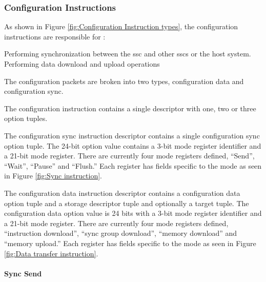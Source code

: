\subsubsection{Configuration Instructions}
\label{sec:Decoding Configuration Instructions}

As shown in Figure \ref{fig:Configuration Instruction types}, the configuration instructions are responsible for :
\begin{outline}
 \1 Performing synchronization between the \ac{ssc} and other \acp{ssc} or the host system.
 \1 Performing data download and upload operations
\end{outline}

The configuration packets are broken into two types, configuration data and configuration sync.
\iffalse
Currently the sync instruction has been implemented.
It is assumed at this point that adequate infrastructure and extensibility has been built into the system to allow implementation without adding significant amounts of logic.
\fi

The configuration instruction contains a single descriptor with one, two or three option tuples.

The configuration sync instruction descriptor contains a single configuration sync option tuple. The 24-bit option value contains a 3-bit mode register identifier and a 21-bit mode register.
There are currently four mode registers defined, ``Send'', ``Wait'', ``Pause'' and ``Flush.'' Each register has fields specific to the mode as seen in Figure \ref{fig:Sync instruction}.

The configuration data instruction descriptor contains a configuration data option tuple and a storage descriptor tuple and optionally a target tuple. 
The configuration data option value is 24 bits with a 3-bit mode register identifier and a 21-bit mode register.
There are currently four mode registers defined, ``instruction download'', ``sync group download'', ``memory download'' and ``memory upload.''   Each register has fields specific to the mode as seen in Figure \ref{fig:Data transfer instruction}.

\paragraph{Sync Send}

